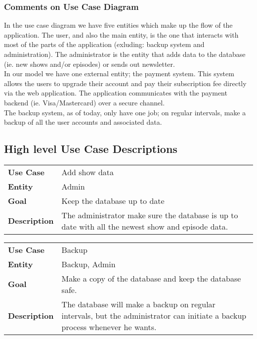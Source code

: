 \subsubsection{Comments on Use Case Diagram}
In the use case diagram we have five entities which make up the flow of the application.
The user, and also the main entity, is the one that interacts with most of the parts of the application (exluding: backup system and administration).
The administrator is the entity that adds data to the database (ie. new shows and/or episodes) or sends out newsletter.
\\
In our model we have one external entity; the payment system. This system allows the users to upgrade their account and pay their subscription fee directly via the web application.
The application communicates with the payment backend (ie. Visa/Mastercard) over a secure channel.\\
The backup system, as of today, only have one job; on regular intervals, make a backup of all the user accounts and associated data.


\subsection{High level Use Case Descriptions}

\begin{framed}
\begin{tabular}{ l p{11cm}}
  \textbf{Use Case} & Add show data \\
  \textbf{Entity} & Admin \\
  \textbf{Goal} & Keep the database up to date\\
  \textbf{Description} & The administrator make sure the database is up to date with all the newest show and episode data. \\
\end{tabular}
\end{framed}

\begin{framed}
\begin{tabular}{ l p{11cm}}
  \textbf{Use Case} & Backup \\
  \textbf{Entity} & Backup, Admin \\
  \textbf{Goal} & Make a copy of the database and keep the database safe.\\
  \textbf{Description} & The database will make a backup on regular intervals, but the administrator can initiate a backup process whenever he wants. \\
\end{tabular}
\end{framed}

